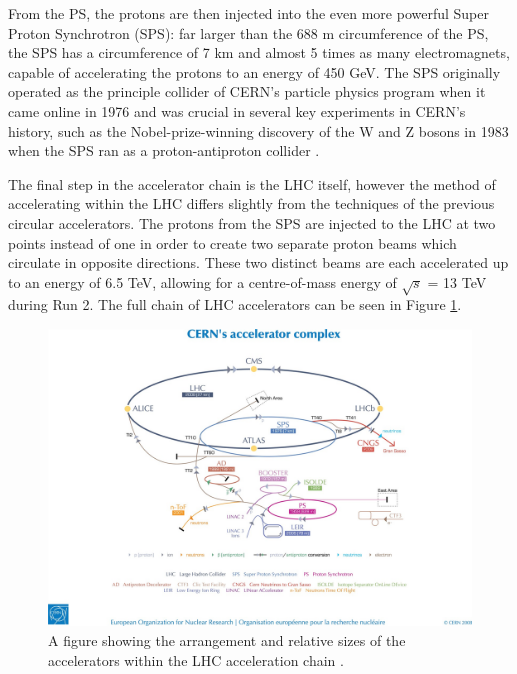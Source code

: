 \documentclass[12pt,a4paper,epsf,portrait,times,epsfig]{report}
\begin{document}
		From the PS, the protons are then injected into the even more powerful Super Proton Synchrotron (SPS): far larger than the 688 m circumference of the PS, the SPS has a circumference of 7 km and almost 5 times as many electromagnets, capable of accelerating the protons to an energy of 450 GeV. The SPS originally operated as the principle collider of CERN's particle physics program when it came online in 1976 and was crucial in several key experiments in CERN's history, such as the Nobel-prize-winning discovery of the W and Z bosons in 1983 when the SPS ran as a proton-antiproton collider \cite{WBosonDiscovery, ZBosonDiscovery}. 

		The final step in the accelerator chain is the LHC itself, however the method of accelerating within the LHC differs slightly from the techniques of the previous circular accelerators. The protons from the SPS are injected to the LHC at two points instead of one in order to create two separate proton beams which circulate in opposite directions. These two distinct beams are each accelerated up to an energy of 6.5 TeV, allowing for a centre-of-mass energy of $\sqrt{s}$ = 13 TeV during Run 2. The full chain of LHC accelerators can be seen in Figure \ref{Fig:CERNRings}. \par

		\begin{figure}
			\centering
			\includegraphics[scale=0.5]{LHC_Rings}
			\caption{A figure showing the arrangement and relative sizes of the accelerators within the LHC acceleration chain \cite{Article:CernComplex}.}
			\label{Fig:CERNRings}
		\end{figure}

\end{document}
